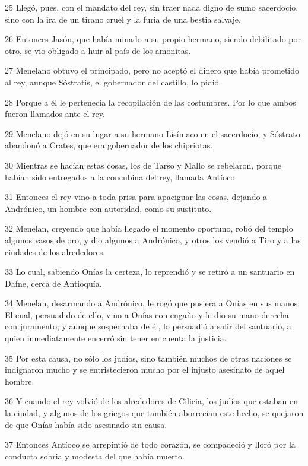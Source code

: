 \par 25 Llegó, pues, con el mandato del rey, sin traer nada digno de sumo sacerdocio, sino con la ira de un tirano cruel y la furia de una bestia salvaje.
\par 26 Entonces Jasón, que había minado a su propio hermano, siendo debilitado por otro, se vio obligado a huir al país de los amonitas.
\par 27 Menelano obtuvo el principado, pero no aceptó el dinero que había prometido al rey, aunque Sóstratis, el gobernador del castillo, lo pidió.
\par 28 Porque a él le pertenecía la recopilación de las costumbres. Por lo que ambos fueron llamados ante el rey.
\par 29 Menelano dejó en su lugar a su hermano Lisímaco en el sacerdocio; y Sóstrato abandonó a Crates, que era gobernador de los chipriotas.
\par 30 Mientras se hacían estas cosas, los de Tarso y Mallo se rebelaron, porque habían sido entregados a la concubina del rey, llamada Antíoco.
\par 31 Entonces el rey vino a toda prisa para apaciguar las cosas, dejando a Andrónico, un hombre con autoridad, como su sustituto.
\par 32 Menelan, creyendo que había llegado el momento oportuno, robó del templo algunos vasos de oro, y dio algunos a Andrónico, y otros los vendió a Tiro y a las ciudades de los alrededores.
\par 33 Lo cual, sabiendo Onías la certeza, lo reprendió y se retiró a un santuario en Dafne, cerca de Antioquía.
\par 34 Menelan, desarmando a Andrónico, le rogó que pusiera a Onías en sus manos; El cual, persuadido de ello, vino a Onías con engaño y le dio su mano derecha con juramento; y aunque sospechaba de él, lo persuadió a salir del santuario, a quien inmediatamente encerró sin tener en cuenta la justicia.
\par 35 Por esta causa, no sólo los judíos, sino también muchos de otras naciones se indignaron mucho y se entristecieron mucho por el injusto asesinato de aquel hombre.
\par 36 Y cuando el rey volvió de los alrededores de Cilicia, los judíos que estaban en la ciudad, y algunos de los griegos que también aborrecían este hecho, se quejaron de que Onías había sido asesinado sin causa.
\par 37 Entonces Antíoco se arrepintió de todo corazón, se compadeció y lloró por la conducta sobria y modesta del que había muerto.
